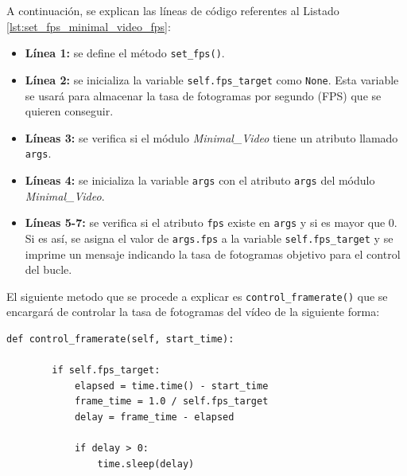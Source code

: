 A continuación, se explican las líneas de código referentes al Listado \ref{lst:set_fps_minimal_video_fps}:
\begin{itemize}
    \item \textbf{Línea 1:} se define el método \texttt{set\_fps()}.
    \item \textbf{Línea 2:} se inicializa la variable \texttt{self.fps\_target} como \texttt{None}. Esta variable se usará para almacenar la tasa de fotogramas por segundo (FPS) que se quieren conseguir.
    \item \textbf{Líneas 3:} se verifica si el módulo \textit{Minimal\_Video} tiene un atributo llamado \texttt{args}.
    \item \textbf{Líneas 4:} se inicializa la variable \texttt{args} con el atributo \texttt{args} del módulo \textit{Minimal\_Video}.
    \item \textbf{Líneas 5-7:} se verifica si el atributo \texttt{fps} existe en \texttt{args} y si es mayor que 0. Si es así, se asigna el valor de \texttt{args.fps} a la variable \texttt{self.fps\_target} y se imprime un mensaje indicando la tasa de fotogramas objetivo para el control del bucle.
\end{itemize}
\vspace{\baselineskip}

El siguiente metodo que se procede a explicar es \texttt{control\_framerate()} que se encargará de controlar la tasa de fotogramas del vídeo de la siguiente forma:
\begin{lstlisting}[style=pythonstyle, caption={Método \texttt{control\_framerate()} de \textit{Minimal\_Video\_FPS}.}, label={lst:control_framerate_minimal_video_fps}]
def control_framerate(self, start_time):

        if self.fps_target:
            elapsed = time.time() - start_time
            frame_time = 1.0 / self.fps_target
            delay = frame_time - elapsed 
            
            if delay > 0:
                time.sleep(delay)
\end{lstlisting}
\vspace{\baselineskip}

